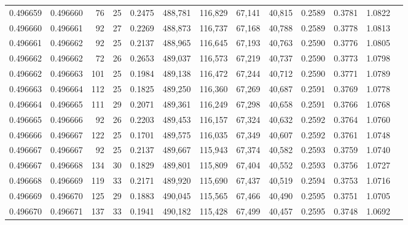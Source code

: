 \begin{tabular}{rrrrrrrrrrrrr}
0.496659 & 0.496660 &  76 &  25 &                                     0.2475 & 488,781 & 116,829 &  67,141 &  40,815 & 0.2589 & 0.3781 & 1.0822 \\
0.496660 & 0.496661 &  92 &  27 &                                     0.2269 & 488,873 & 116,737 &  67,168 &  40,788 & 0.2589 & 0.3778 & 1.0813 \\
0.496661 & 0.496662 &  92 &  25 &                                     0.2137 & 488,965 & 116,645 &  67,193 &  40,763 & 0.2590 & 0.3776 & 1.0805 \\
0.496662 & 0.496662 &  72 &  26 &                                     0.2653 & 489,037 & 116,573 &  67,219 &  40,737 & 0.2590 & 0.3773 & 1.0798 \\
0.496662 & 0.496663 & 101 &  25 &                                     0.1984 & 489,138 & 116,472 &  67,244 &  40,712 & 0.2590 & 0.3771 & 1.0789 \\
0.496663 & 0.496664 & 112 &  25 &                                     0.1825 & 489,250 & 116,360 &  67,269 &  40,687 & 0.2591 & 0.3769 & 1.0778 \\
0.496664 & 0.496665 & 111 &  29 &                                     0.2071 & 489,361 & 116,249 &  67,298 &  40,658 & 0.2591 & 0.3766 & 1.0768 \\
0.496665 & 0.496666 &  92 &  26 &                                     0.2203 & 489,453 & 116,157 &  67,324 &  40,632 & 0.2592 & 0.3764 & 1.0760 \\
0.496666 & 0.496667 & 122 &  25 &                                     0.1701 & 489,575 & 116,035 &  67,349 &  40,607 & 0.2592 & 0.3761 & 1.0748 \\
0.496667 & 0.496667 &  92 &  25 &                                     0.2137 & 489,667 & 115,943 &  67,374 &  40,582 & 0.2593 & 0.3759 & 1.0740 \\
0.496667 & 0.496668 & 134 &  30 &                                     0.1829 & 489,801 & 115,809 &  67,404 &  40,552 & 0.2593 & 0.3756 & 1.0727 \\
0.496668 & 0.496669 & 119 &  33 &                                     0.2171 & 489,920 & 115,690 &  67,437 &  40,519 & 0.2594 & 0.3753 & 1.0716 \\
0.496669 & 0.496670 & 125 &  29 &                                     0.1883 & 490,045 & 115,565 &  67,466 &  40,490 & 0.2595 & 0.3751 & 1.0705 \\
0.496670 & 0.496671 & 137 &  33 &                                     0.1941 & 490,182 & 115,428 &  67,499 &  40,457 & 0.2595 & 0.3748 & 1.0692 \\

\end{tabular}
